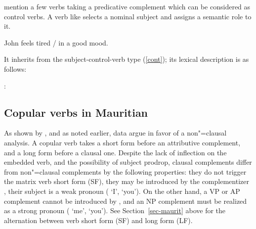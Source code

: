 \documentclass[output=paper
	        ,collection
	        ,collectionchapter
 	        ,biblatex
                ,babelshorthands
                ,newtxmath
                ,draftmode
                ,colorlinks, citecolor=brown
]{langscibook}
\begin{document}
\citet{PollardandSag1994} mention a few verbs taking a predicative complement which can be considered as control verbs. A verb like  selects a nominal subject and assigns a semantic role to it. 

\begin{exe}
\ex John feels tired / in a good mood.
\end{exe}

\noindent
It inherits from the subject-control-verb type (\ref{cont}); its lexical description is as follows:

\eas
{}:\\
\zs


\subsection{Copular verbs in Mauritian}

As shown by \citet{HenriandLaurens2011}, and as noted earlier,  data argue in favor of a non"=clausal
analysis. A copular verb takes a short form before an attributive complement, and a long form before
a clausal one. Despite the lack of inflection on the embedded verb, and the possibility of subject
prodrop,  clausal complements differ from non"=clausal complements by the following properties: they
do not trigger the matrix verb short form (SF), they may be introduced by the complementizer ,
their subject is a weak pronoun ( `I',  `you'). On the other hand, a VP or AP complement
cannot be introduced by , and an NP complement must be realized as a strong pronoun ( `me',
 `you'). See Section~\ref{sec-maurit} above for the alternation between verb short form (SF) and long form (LF).
\end{document}
